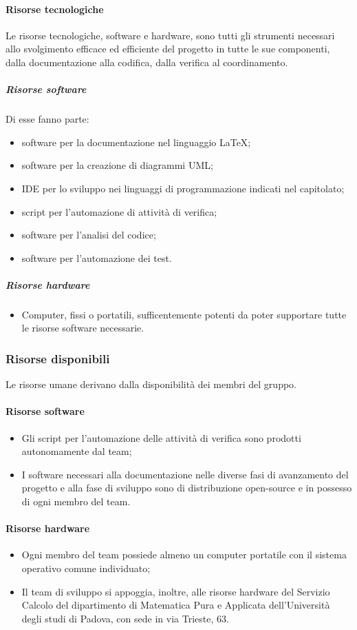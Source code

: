 	\paragraph{Risorse tecnologiche}
		Le risorse tecnologiche, software e hardware, sono tutti gli strumenti necessari allo svolgimento efficace ed efficiente del progetto in tutte le sue componenti, dalla documentazione alla codifica, dalla verifica al coordinamento.
		\subparagraph{Risorse software}
		Di esse fanno parte:
			\begin{itemize}
				\item software per la documentazione nel linguaggio \LaTeX{};
				\item software per la creazione di diagrammi UML;
				\item IDE per lo sviluppo nei linguaggi di programmazione indicati nel capitolato;
				\item script per l'automazione di attività di verifica;
				\item software per l'analisi del codice;
				\item software per l'automazione dei test.
			\end{itemize}
		\subparagraph{Risorse hardware}
			\begin{itemize}
				\item Computer, fissi o portatili, sufficentemente potenti da poter supportare tutte le risorse software necessarie.
			\end{itemize}
	\subsubsection{Risorse disponibili}
	Le risorse umane derivano dalla disponibilità dei membri del gruppo.
	\paragraph{Risorse software}
		\begin{itemize}
			\item Gli script per l'automazione delle attività di verifica sono prodotti autonomamente dal team;
			\item I software necessari alla documentazione nelle diverse fasi di avanzamento  del progetto e alla fase di sviluppo sono di distribuzione open-source e in possesso di ogni membro del team.
		\end{itemize}
	\paragraph{Risorse hardware}
		\begin{itemize}
			\item Ogni membro del team possiede almeno un computer portatile con il sistema operativo comune individuato;
			\item Il team di sviluppo si appoggia, inoltre, alle risorse hardware del Servizio Calcolo del dipartimento di Matematica Pura e Applicata dell'Università degli studi di Padova, con sede in via Trieste, 63.
		\end{itemize}
